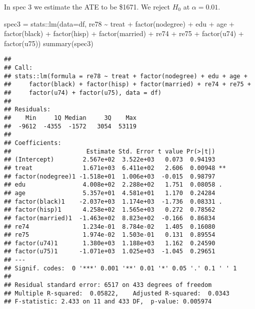 \documentclass[
]{article}
\newenvironment{Shaded}{\begin{snugshade}}{\end{snugshade}}
\newcommand{\AttributeTok}[1]{\textcolor[rgb]{0.77,0.63,0.00}{#1}}
\newcommand{\FunctionTok}[1]{\textcolor[rgb]{0.00,0.00,0.00}{#1}}
\newcommand{\NormalTok}[1]{#1}
\newcommand{\OtherTok}[1]{\textcolor[rgb]{0.56,0.35,0.01}{#1}}
\newcommand{\SpecialCharTok}[1]{\textcolor[rgb]{0.00,0.00,0.00}{#1}}
\begin{document}
In spec 3 we estimate the ATE to be \$1671. We reject \(H_0\) at
\(\alpha = 0.01\).

\begin{Shaded}
\begin{Highlighting}[]
\NormalTok{spec3 }\OtherTok{=}\NormalTok{ stats}\SpecialCharTok{::}\FunctionTok{lm}\NormalTok{(}\AttributeTok{data=}\NormalTok{df, re78 }\SpecialCharTok{\textasciitilde{}}\NormalTok{ treat }\SpecialCharTok{+} \FunctionTok{factor}\NormalTok{(nodegree) }\SpecialCharTok{+}\NormalTok{ edu }\SpecialCharTok{+}\NormalTok{ age }\SpecialCharTok{+} \FunctionTok{factor}\NormalTok{(black) }\SpecialCharTok{+} \FunctionTok{factor}\NormalTok{(hisp) }\SpecialCharTok{+} \FunctionTok{factor}\NormalTok{(married) }\SpecialCharTok{+}\NormalTok{ re74 }\SpecialCharTok{+}\NormalTok{ re75 }\SpecialCharTok{+} \FunctionTok{factor}\NormalTok{(u74) }\SpecialCharTok{+} \FunctionTok{factor}\NormalTok{(u75))}
\FunctionTok{summary}\NormalTok{(spec3)}
\end{Highlighting}
\end{Shaded}

\begin{verbatim}
## 
## Call:
## stats::lm(formula = re78 ~ treat + factor(nodegree) + edu + age + 
##     factor(black) + factor(hisp) + factor(married) + re74 + re75 + 
##     factor(u74) + factor(u75), data = df)
## 
## Residuals:
##    Min     1Q Median     3Q    Max 
##  -9612  -4355  -1572   3054  53119 
## 
## Coefficients:
##                     Estimate Std. Error t value Pr(>|t|)   
## (Intercept)        2.567e+02  3.522e+03   0.073  0.94193   
## treat              1.671e+03  6.411e+02   2.606  0.00948 **
## factor(nodegree)1 -1.518e+01  1.006e+03  -0.015  0.98797   
## edu                4.008e+02  2.288e+02   1.751  0.08058 . 
## age                5.357e+01  4.581e+01   1.170  0.24284   
## factor(black)1    -2.037e+03  1.174e+03  -1.736  0.08331 . 
## factor(hisp)1      4.258e+02  1.565e+03   0.272  0.78562   
## factor(married)1  -1.463e+02  8.823e+02  -0.166  0.86834   
## re74               1.234e-01  8.784e-02   1.405  0.16080   
## re75               1.974e-02  1.503e-01   0.131  0.89554   
## factor(u74)1       1.380e+03  1.188e+03   1.162  0.24590   
## factor(u75)1      -1.071e+03  1.025e+03  -1.045  0.29651   
## ---
## Signif. codes:  0 '***' 0.001 '**' 0.01 '*' 0.05 '.' 0.1 ' ' 1
## 
## Residual standard error: 6517 on 433 degrees of freedom
## Multiple R-squared:  0.05822,    Adjusted R-squared:  0.0343 
## F-statistic: 2.433 on 11 and 433 DF,  p-value: 0.005974
\end{verbatim}
\end{document}
